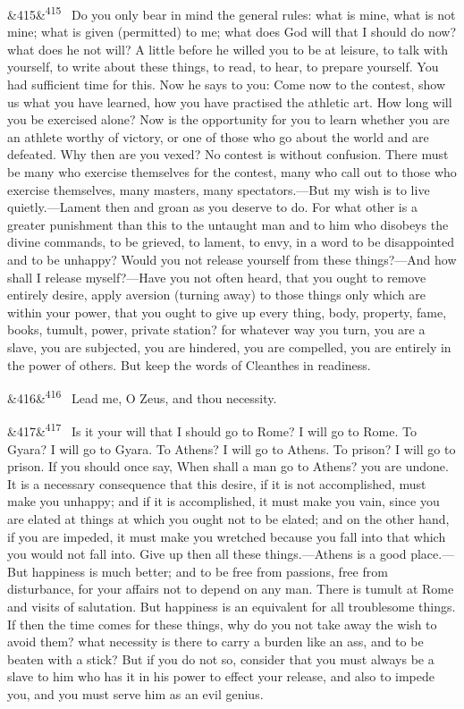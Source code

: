 \documentclass[12pt]{article}
\newcommand{\para}[1][]{\par\noindent\ifx&#1&\else\textsuperscript{\footnotesize #1}~\fi}
\begin{document}
\para[415] Do you only bear in mind the general rules: what is mine, what is not mine; what is given (permitted) to me; what does God will that I should do now? what does he not will? A little before he willed you to be at leisure, to talk with yourself, to write about these things, to read, to hear, to prepare yourself. You had sufficient time for this. Now he says to you: Come now to the contest, show us what you have learned, how you have practised the athletic art. How long will you be exercised alone? Now is the opportunity for you to learn whether you are an athlete worthy of victory, or one of those who go about the world and are defeated. Why then are you vexed? No contest is without confusion. There must be many who exercise themselves for the contest, many who call out to those who exercise themselves, many masters, many spectators.—But my wish is to live quietly.—Lament then and groan as you deserve to do. For what other is a greater punishment than this to the untaught man and to him who disobeys the divine commands, to be grieved, to lament, to envy, in a word to be disappointed and to be unhappy? Would you not release yourself from these things?—And how shall I release myself?—Have you not often heard, that you ought to remove entirely desire, apply aversion (turning away) to those things only which are within your power, that you ought to give up every thing, body, property, fame, books, tumult, power, private station? for whatever way you turn, you are a slave, you are subjected, you are hindered, you are compelled, you are entirely in the power of others. But keep the words of Cleanthes in readiness.

\para[416] Lead me, O Zeus, and thou necessity.

\para[417] Is it your will that I should go to Rome? I will go to Rome. To Gyara? I will go to Gyara. To Athens? I will go to Athens. To prison? I will go to prison. If you should once say, When shall a man go to Athens? you are undone. It is a necessary consequence that this desire, if it is not accomplished, must make you unhappy; and if it is accomplished, it must make you vain, since you are elated at things at which you ought not to be elated; and on the other hand, if you are impeded, it must make you wretched because you fall into that which you would not fall into. Give up then all these things.—Athens is a good place.—But happiness is much better; and to be free from passions, free from disturbance, for your affairs not to depend on any man. There is tumult at Rome and visits of salutation. But happiness is an equivalent for all troublesome things. If then the time comes for these things, why do you not take away the wish to avoid them? what necessity is there to carry a burden like an ass, and to be beaten with a stick? But if you do not so, consider that you must always be a slave to him who has it in his power to effect your release, and also to impede you, and you must serve him as an evil genius.
\end{document}
